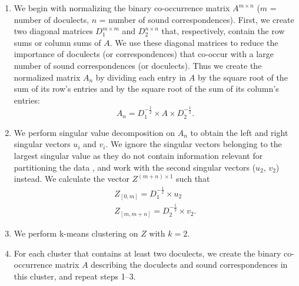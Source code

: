 \documentclass[a4paper]{article}
\begin{document}
\begin{enumerate}
\item 
We begin with normalizing the binary co-occurrence matrix
$A^{m \times n}$ ($m$ = number of doculects, $n$ = number of sound correspondences).
First, we create two diagonal matrices
$D_1^{m \times m}$ and $D_2^{n \times n}$ that, respectively,
contain the row sums or column sums of $A$.
We use these diagonal matrices to reduce
the importance of doculects (or correspondences)
that co-occur with a large number
of sound correspondences (or doculects).
Thus we create the normalized matrix $A_n$
by dividing each entry in $A$ by
the square root of the sum of its row's entries
and by the square root of the sum of its column's entries:
\begin{equation*}
A_n = D_1^{-\frac{1}{2}} \times A \times D_2^{-\frac{1}{2}}.
\end{equation*}

\item
We perform singular value decomposition on $A_n$
to obtain the left and right singular vectors $u_i$ and $v_i$.
We ignore the singular vectors belonging
to the largest singular value as they do not contain
information relevant for partitioning the data \citep{kluger2003spectral},
and work with the second singular vectors ($u_2$, $v_2$) instead.
We calculate the vector $Z^{(m + n) \times 1}$ such that
\begin{align*}
Z_{[0, m]} = D_1^{-\frac{1}{2}} \times u_2\\
Z_{[m, m+n]} = D_2^{-\frac{1}{2}} \times v_2
.
\end{align*}


\item
We perform k-means clustering on $Z$ with $k = 2$.

\item
For each cluster that contains at least two doculects,
we create the binary co-occurrence matrix $A$ describing
the doculects and sound correspondences in this cluster,
and repeat steps 1--3.
\end{enumerate}
\end{document}
